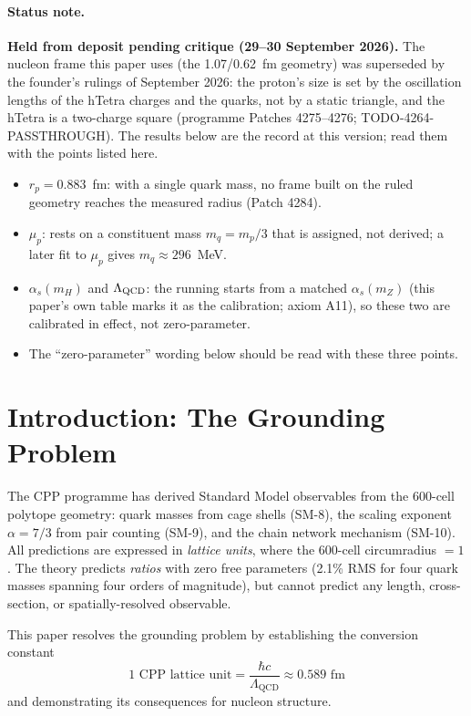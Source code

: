 \documentclass[12pt,a4paper]{article}
\begin{document}
\paragraph{Status note.} \textbf{Held from deposit pending critique (29--30 September 2026).} The nucleon frame this paper uses (the 1.07/0.62~fm geometry) was superseded by the founder's rulings of September 2026: the proton's size is set by the oscillation lengths of the hTetra charges and the quarks, not by a static triangle, and the hTetra is a two-charge square (programme Patches 4275--4276; TODO-4264-PASSTHROUGH). The results below are the record at this version; read them with the points listed here.
\begin{itemize}
\item $r_p = 0.883$~fm: with a single quark mass, no frame built on the ruled geometry reaches the measured radius (Patch 4284).
\item $\mu_p$: rests on a constituent mass $m_q = m_p/3$ that is assigned, not derived; a later fit to $\mu_p$ gives $m_q \approx 296$~MeV.
\item $\alpha_s(m_H)$ and $\Lambda_{\rm QCD}$: the running starts from a matched $\alpha_s(m_Z)$ (this paper's own table marks it as the calibration; axiom A11), so these two are calibrated in effect, not zero-parameter.
\item The ``zero-parameter'' wording below should be read with these three points.
\end{itemize}

\tableofcontents

\section{Introduction: The Grounding Problem}

The CPP programme has derived Standard Model observables from the 600-cell polytope geometry: quark masses from cage shells (SM-8), the scaling exponent $\alpha = 7/3$ from pair counting (SM-9), and the chain network mechanism (SM-10). All predictions are expressed in \emph{lattice units}, where the 600-cell circumradius $= 1$. The theory predicts \emph{ratios} with zero free parameters (2.1\% RMS for four quark masses spanning four orders of magnitude), but cannot predict any length, cross-section, or spatially-resolved observable.

This paper resolves the grounding problem by establishing the conversion constant
\begin{equation}
\boxed{1 \text{ CPP lattice unit} = \frac{\hbar c}{\Lambda_{\mathrm{QCD}}} \approx 0.589 \text{ fm}}
\label{eq:conversion}
\end{equation}
and demonstrating its consequences for nucleon structure.
\end{document}
